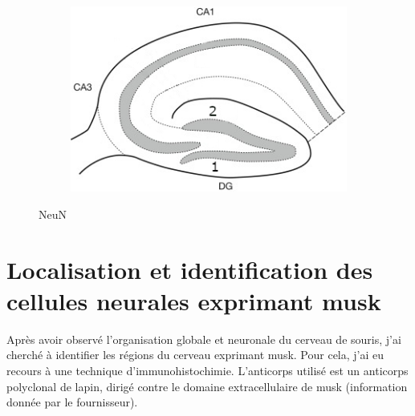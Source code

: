 \begin{figure}[h]
\begin{center}
\begin{subfigure}[h]{0.329\textwidth}
			\end{subfigure}
			\begin{subfigure}[h]{0.329\textwidth}
				\caption{}
				\label{fig:hippIllu}
				\includegraphics[width=\textwidth]{./Images/HippSchema.jpg}
			\end{subfigure}
			\begin{subfigure}[h]{0.49\textwidth}
			\end{subfigure}
		\end{center}
		\caption{NeuN}
		\label{fig:NeuNResultat}
	\end{figure}
	
\section{Localisation et identification des cellules neurales exprimant \acrshort{musk}}
	\label{ssec:musk}
	Après avoir observé l'organisation globale et neuronale du cerveau de souris, j'ai cherché à identifier les régions du cerveau exprimant \gls{musk}. Pour cela, j'ai eu recours à une technique d'immunohistochimie. L'anticorps utilisé est un anticorps polyclonal de lapin, dirigé contre le domaine extracellulaire de \gls{musk} (information donnée par le fournisseur).
	
